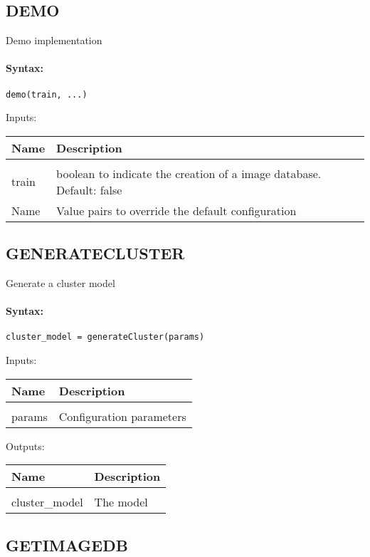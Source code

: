 
\subsection{DEMO}

Demo implementation

\paragraph{Syntax:} \verb|demo(train, ...)|

Inputs:

\begin{tabular}{|l|p{5cm}|}
\hline
\textbf{Name} & \textbf{Description} \\
\hline \hline \\
train & boolean to indicate the creation of a image database. Default: false  \\ \hline
Name & Value pairs to override the default configuration  \\ \hline
\end{tabular}

\subsection{GENERATECLUSTER}

Generate a cluster model

\paragraph{Syntax:} \verb|cluster_model = generateCluster(params)|

Inputs:

\begin{tabular}{|l|p{5cm}|}
\hline
\textbf{Name} & \textbf{Description} \\
\hline \hline \\
params & Configuration parameters  \\ \hline
\end{tabular}
Outputs:

\begin{tabular}{|l|p{5cm}|}
\hline
\textbf{Name} & \textbf{Description} \\
\hline \hline \\
cluster\_model & The model  \\ \hline
\end{tabular}

\subsection{GETIMAGEDB}

